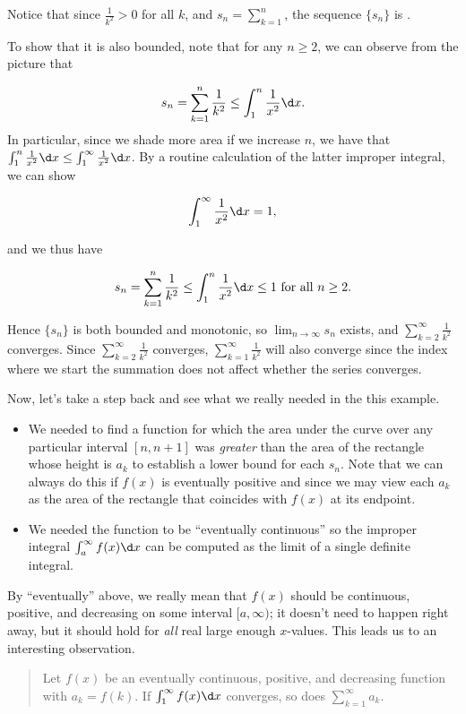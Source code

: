 \documentclass{ximera}
\begin{document}
\begin{model}
Notice that since $\frac{1}{k^2} > 0$ for all $k$, and $s_n = \sum_{k=1}^n$, the sequence $\{s_n\}$ is .  

To show that it is also bounded, note that for any $n \geq 2$, we can observe from the picture that 

\[
s_n = \sum_{k=1}^n\frac{1}{k^2} \leq
\int_1^n \frac{1}{x^2} \d x.
\]
In particular, since we shade more area if we increase $n$, we have that $\int_1^n \frac{1}{x^2} \d x \leq \int_1^\infty \frac{1}{x^2} \d x$.  By a routine calculation of the latter improper integral, we can show

\[
\int_1^\infty \frac{1}{x^2} \d x = 1,
\]

and we thus have 

\[
s_n = \sum_{k=1}^n\frac{1}{k^2} \leq \int_1^n \frac{1}{x^2} \d x \leq 1 \textrm{ for all } n \geq 2.
\]

Hence $\{s_n\}$ is both bounded and monotonic, so $\lim_{n \to \infty} s_n$ exists, and $\sum_{k=2}^{\infty} \frac{1}{k^2}$ converges.  Since $\sum_{k=2}^{\infty} \frac{1}{k^2}$ converges, $\sum_{k=1}^{\infty} \frac{1}{k^2}$ will also converge since the index where we start the summation does not affect whether the series converges.

\end{model}


Now, let's take a step back and see what we really needed in the this example.

\begin{itemize}
\item We needed to find a function for which the area under the curve over any particular interval $[n,n+1]$ was \emph{greater} than the area of the rectangle whose height is $a_k$ to establish a lower bound for each $s_n$.  Note that we can always do this if $f(x)$ is eventually positive and  since we may view each $a_k$ as the area of the rectangle that coincides with $f(x)$ at its  endpoint.
\item We needed the function to be ``eventually continuous'' so the improper integral $\int_{a}^{\infty} f(x) \d x$ can be computed as the limit of a single definite integral.
\end{itemize}

By ``eventually'' above, we really mean that $f(x)$ should be continuous, positive, and decreasing on some interval $[a,\infty)$; it doesn't need to happen right away, but it should hold for \emph{all} real large enough $x$-values.  This leads us to an interesting observation.
\begin{quote}
  Let $f(x)$ be an eventually continuous, positive, and decreasing function with
    $a_k = f(k)$.  If $\int_1^\infty f(x) \d x$ converges, so does
    $\sum_{k=1}^\infty a_k$.
\end{quote}
\end{document}
